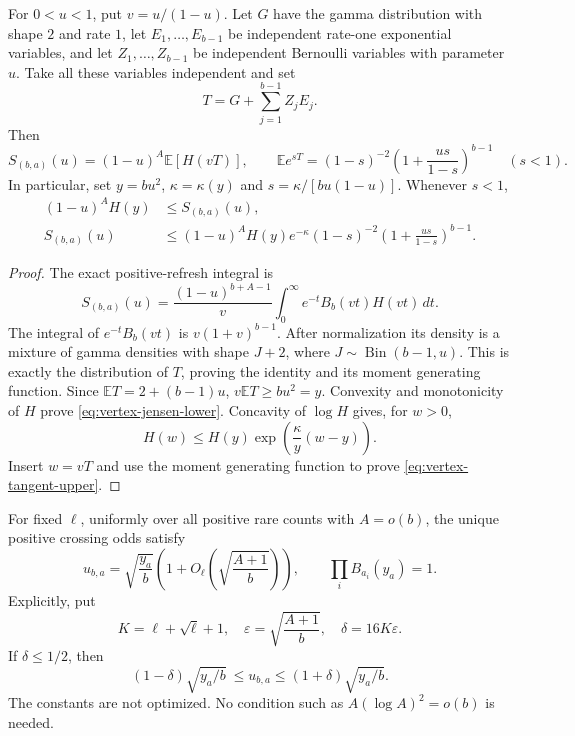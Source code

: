\begin{lemma}
\label{lem:vertex-randomization}
For $0<u<1$, put $v=u/(1-u)$. Let $G$ have the gamma distribution
with shape $2$ and rate $1$, let $E_1,\ldots,E_{b-1}$ be independent
rate-one exponential variables, and let $Z_1,\ldots,Z_{b-1}$ be
independent Bernoulli variables with parameter $u$. Take all these
variables independent and set
\[
 T=G+\sum_{j=1}^{b-1}Z_jE_j.
\]
Then
\begin{equation}\label{eq:vertex-randomization}
 S_{(b,a)}(u)=(1-u)^A\mathbb E[H(vT)],\qquad
 \mathbb E e^{sT}=(1-s)^{-2}
 \left(1+\frac{us}{1-s}\right)^{b-1}\quad(s<1).
\end{equation}
In particular, set $y=bu^2$, $\kappa=\kappa(y)$ and
$s=\kappa/[bu(1-u)]$. Whenever $s<1$,
\begin{align}
 (1-u)^A H(y)&\le S_{(b,a)}(u),\label{eq:vertex-jensen-lower}\\
 S_{(b,a)}(u)&\le (1-u)^A H(y)e^{-\kappa}(1-s)^{-2}
 \left(1+\frac{us}{1-s}\right)^{b-1}.
 \label{eq:vertex-tangent-upper}
\end{align}
\end{lemma}

\begin{proof}
The exact positive-refresh integral is
\[
 S_{(b,a)}(u)=\frac{(1-u)^{b+A-1}}v
 \int_0^\infty e^{-t}B_b(vt)H(vt)\,dt.
\]
The integral of $e^{-t}B_b(vt)$ is $v(1+v)^{b-1}$.
After normalization its density is a mixture of gamma densities with
shape $J+2$, where $J\sim\operatorname{Bin}(b-1,u)$. This is exactly
the distribution of $T$, proving the identity and its moment generating
function. Since $\mathbb ET=2+(b-1)u$,
$v\mathbb ET\ge bu^2=y$. Convexity and monotonicity of $H$ prove
\eqref{eq:vertex-jensen-lower}. Concavity of $\log H$ gives, for $w>0$,
\[
 H(w)\le H(y)\exp\!\left(\frac{\kappa}{y}(w-y)\right).
\]
Insert $w=vT$ and use the moment generating function to prove
\eqref{eq:vertex-tangent-upper}.
\end{proof}

\begin{theorem}
\label{thm:vertex-uniform-root}
For fixed $\ell$, uniformly over all positive rare counts with $A=o(b)$,
the unique positive crossing odds satisfy
\begin{equation}\label{eq:vertex-uniform-root}
 u_{b,a}=\sqrt{\frac{y_a}{b}}
 \left(1+O_\ell\!\left(\sqrt{\frac{A+1}{b}}\right)\right),
 \qquad \prod_i B_{a_i}(y_a)=1.
\end{equation}
Explicitly, put
\[
 K=\ell+\sqrt\ell+1,\quad
 \varepsilon=\sqrt{\frac{A+1}{b}},\quad \delta=16K\varepsilon.
\]
If $\delta\le1/2$, then
\begin{equation}\label{eq:vertex-uniform-bracket}
 (1-\delta)\sqrt{y_a/b}\ \le u_{b,a}\le
 (1+\delta)\sqrt{y_a/b}.
\end{equation}
The constants are not optimized. No condition such as $A(\log A)^2=o(b)$
is needed.
\end{theorem}

